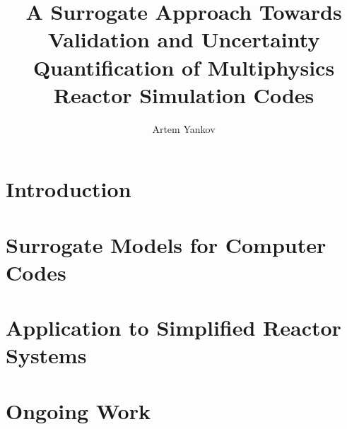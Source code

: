 \documentclass[thesis]{thesis-umich}
\title{A Surrogate Approach Towards Validation and Uncertainty Quantification of Multiphysics Reactor Simulation Codes}
\author{Artem Yankov}
\begin{document}
\chapter{Introduction}   \label{chap:intro}


\chapter{Surrogate Models for Computer Codes} \label{chap:rom}


\chapter{Application to Simplified Reactor Systems} \label{chap:applications}


\chapter{Ongoing Work} \label{chap:ongoing_work}




\end{document}
